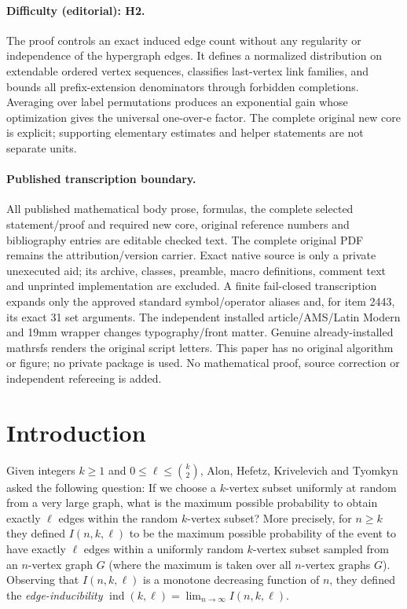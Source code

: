 \documentclass[11pt]{article}
\theoremstyle{definition}
\numberwithin{equation}{section}
\begin{document}
\paragraph{Difficulty (editorial): H2.} The proof controls an exact induced edge count without any regularity or independence of the hypergraph edges. It defines a normalized distribution on extendable ordered vertex sequences, classifies last-vertex link families, and bounds all prefix-extension denominators through forbidden completions. Averaging over label permutations produces an exponential gain whose optimization gives the universal one-over-e factor. The complete original new core is explicit; supporting elementary estimates and helper statements are not separate units.
\paragraph{Published transcription boundary.} All published mathematical body prose, formulas, the complete selected statement/proof and required new core, original reference numbers and bibliography entries are editable checked text. The complete original PDF remains the attribution/version carrier. Exact native source is only a private unexecuted aid; its archive, classes, preamble, macro definitions, comment text and unprinted implementation are excluded. A finite fail-closed transcription expands only the approved standard symbol/operator aliases and, for item 2443, its exact 31 set arguments. The independent installed article/AMS/Latin Modern and 19mm wrapper changes typography/front matter. Genuine already-installed mathrsfs renders the original script letters. This paper has no original algorithm or figure; no private package is used. No mathematical proof, source correction or independent refereeing is added.
\clearpage
\section{Introduction}

Given integers $k\geq 1$ and $0\leq \ell\leq {k\choose 2}$, Alon, Hefetz, Krivelevich and Tyomkyn \cite{alon-et-al} asked the following question: If we choose a $k$-vertex subset uniformly at random from a very large graph, what is the maximum possible probability to obtain exactly $\ell$ edges within the random $k$-vertex subset? More precisely, for $n\geq k$ they defined $I(n,k,\ell)$ to be the maximum possible probability of the event to have exactly $\ell$ edges within a uniformly random $k$-vertex subset sampled from an $n$-vertex graph $G$ (where the maximum is taken over all $n$-vertex graphs $G$). Observing that $I(n,k,\ell)$ is a monotone decreasing function of $n$, they defined the \emph{edge-inducibility} $\operatorname{ind}(k,\ell)=\lim_{n\to\infty} I(n,k,\ell)$.
\end{document}
